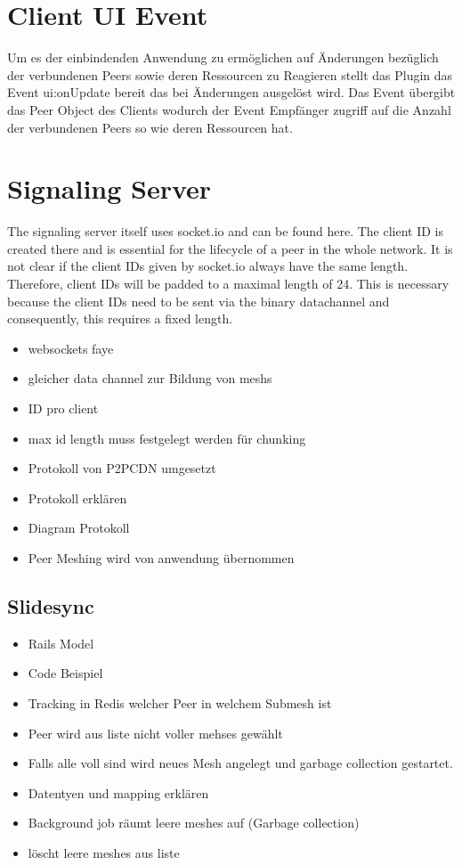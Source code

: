 \section{Client UI Event}
Um es der einbindenden Anwendung zu ermöglichen auf Änderungen bezüglich der verbundenen Peers sowie deren Ressourcen zu Reagieren stellt das Plugin das Event ui:onUpdate bereit das bei Änderungen ausgelöst wird. Das Event übergibt das Peer Object des Clients wodurch der Event Empfänger zugriff auf die Anzahl der verbundenen Peers so wie deren Ressourcen hat. 

\section{Signaling Server}
The signaling server itself uses socket.io and can be found here. The client ID is created there and is essential for the lifecycle of a peer in the whole network. It is not clear if the client IDs given by socket.io always have the same length. Therefore, client IDs will be padded to a maximal length of 24. This is necessary because the client IDs need to be sent via the binary datachannel and consequently, this requires a fixed length.


\begin{itemize}
  \item websockets faye
  \item gleicher data channel zur Bildung von meshs
  \item ID pro client
  \item max id length muss festgelegt werden für chunking
  \item Protokoll von P2PCDN umgesetzt
  \item Protokoll erklären
  \item Diagram Protokoll
  \item Peer Meshing wird von anwendung übernommen
\end{itemize}

\subsection{Slidesync}
\begin{itemize}
	\item Rails Model
	\item Code Beispiel
	\item Tracking in Redis welcher Peer in welchem Submesh ist
	\item Peer wird aus liste nicht voller mehses gewählt
	\item Falls alle voll sind wird neues Mesh angelegt und garbage collection gestartet.
	\item Datentyen und mapping erklären
	\item Background job räumt leere meshes auf (Garbage collection)
	\item 	löscht leere meshes aus liste
\end{itemize}


